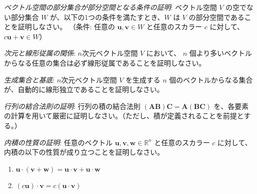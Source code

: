 \begin{quiz}
\emph{ベクトル空間の部分集合が部分空間となる条件の証明}: ベクトル空間 $V$ の空でない部分集合 $W$ が、以下の1つの条件を満たすとき、$W$ は $V$ の部分空間であることを証明しなさい。
（条件: 任意の $\bm{u}, \bm{v} \in W$ と任意のスカラー $c$ に対して、$c\bm{u} + \bm{v} \in W$）
\end{quiz}

\begin{quiz}
\emph{次元と線形従属の関係}: $n$次元ベクトル空間 $V$ において、 $n$ 個より多いベクトルからなる任意の集合は必ず線形従属であることを証明しなさい。
\end{quiz}

\begin{quiz}
\emph{生成集合と基底}: $n$次元ベクトル空間 $V$ を生成する $n$ 個のベクトルからなる集合が、自動的に線形独立であることを証明しなさい。
\end{quiz}

\begin{quiz}
\emph{行列の結合法則の証明}: 行列の積の結合法則 $(\bm{A}\bm{B})\bm{C} = \bm{A}(\bm{B}\bm{C})$ を、各要素の計算を用いて厳密に証明しなさい。（ただし、積が定義されることを前提とする。）
\end{quiz}

\begin{quiz}
\emph{内積の性質の証明}: 任意のベクトル $\bm{u}, \bm{v}, \bm{w} \in \mathbb{R}^n$ と任意のスカラー $c$ に対して、内積の以下の性質が成り立つことを証明しなさい。
\begin{enumerate}
    \item $\bm{u} \cdot (\bm{v} + \bm{w}) = \bm{u} \cdot \bm{v} + \bm{u} \cdot \bm{w}$
    \item $(c\bm{u}) \cdot \bm{v} = c(\bm{u} \cdot \bm{v})$
\end{enumerate}
\end{quiz}